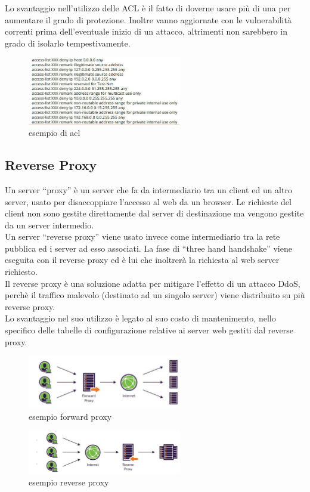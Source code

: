 Lo svantaggio nell’utilizzo delle ACL è il fatto di doverne usare più di una per aumentare il grado di protezione. Inoltre vanno aggiornate con le vulnerabilità correnti prima dell’eventuale inizio di un attacco, altrimenti non sarebbero in grado di isolarlo tempestivamente.\\
\begin{figure}[!h]
\centering
\includegraphics[width=0.6\textwidth]{images/acl.eps}
\caption{esempio di acl}
\label{acl}
\end{figure}
\subsection{Reverse Proxy}
Un server “proxy” è un server che fa da intermediario tra un client ed un altro server, usato per disaccoppiare l’accesso al web da un browser. Le richieste del client non sono gestite direttamente dal server di destinazione ma vengono gestite da un server intermedio.\\
Un server “reverse proxy” viene usato invece come intermediario tra la rete pubblica ed i server ad esso associati. La fase di “three hand handshake” viene eseguita con il reverse proxy ed è lui che inoltrerà la richiesta al web server richiesto.\\
Il reverse proxy è una soluzione adatta per mitigare l’effetto di un attacco DdoS, perchè il traffico malevolo (destinato ad un singolo server) viene distribuito su più reverse proxy.\\
Lo svantaggio nel suo utilizzo è legato al suo costo di mantenimento, nello specifico delle tabelle di configurazione relative ai server web gestiti dal reverse proxy.\\
\begin{figure}[!h]
\centering
\includegraphics[width=0.6\textwidth]{images/proxy_1.eps}
\caption{esempio forward proxy}
\label{fproxy}
\end{figure}
\begin{figure}[!h]
\centering
\includegraphics[width=0.6\textwidth]{images/proxy_2.eps}
\caption{esempio reverse proxy}
\label{rproxy}
\end{figure}
